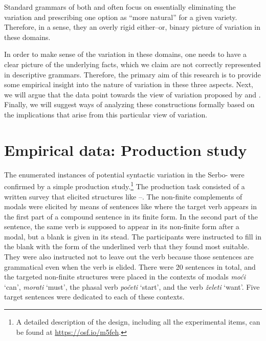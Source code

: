\documentclass[output=paper,modfonts,newtxmath,hidelinks,]{langscibook}
\begin{document}
\ea \label{7:ex4}
	\z
\z

\noindent Standard grammars of both  and  often focus on essentially eliminating the variation and prescribing one option as ``more natural'' for a given variety. Therefore, in a sense, they  an overly rigid either--or, binary picture of variation in these domains.

In order to make sense of the variation in these domains, one needs to have a clear picture of the underlying facts, which we claim are not correctly represented in descriptive grammars. Therefore, the primary aim of this research is to provide some empirical insight into the nature of variation in these three aspects. Next, we will argue that the data point towards the view of variation proposed by  \citet{AdgerTrousdale2007} and \citet{AdgerSmith2005}. Finally, we will suggest ways of analyzing these constructions formally based on the implications that arise from this particular view of variation.

\section{Empirical data: Production study}\label{7:s2}

The enumerated instances of potential syntactic variation in the Serbo-  were confirmed by a simple production study.\footnote{\label{7:fn1}A detailed description of the design, including all the experimental items, can be found at \url{https://osf.io/m5feh}.} The production task consisted of a written survey that elicited structures like --. The non-finite complements of modals were elicited by means of sentences like  where the target verb appears in the first part of a compound sentence in its finite form. In the second part of the sentence, the same verb is supposed to appear in its non-finite form after a modal, but a blank is given in its stead. The participants were instructed to fill in the blank with the form of the underlined verb that they found most suitable. They were also instructed not to leave out the verb because those sentences are grammatical even when the verb is elided. There were 20 sentences in total, and the targeted non-finite structures were placed in the contexts of modals \textit{moći} `can', \textit{morati} `must', the phasal verb \textit{početi} `start', and the verb \textit{želeti} `want'. Five target sentences were dedicated to each of these contexts.\largerpage[2]
\end{document}
